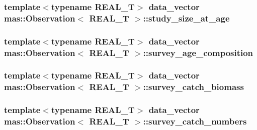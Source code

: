\subsubsection[{study\+\_\+size\+\_\+at\+\_\+age}]{\setlength{\rightskip}{0pt plus 5cm}template$<$typename R\+E\+A\+L\+\_\+\+T$>$ data\+\_\+vector {\bf mas\+::\+Observation}$<$ R\+E\+A\+L\+\_\+\+T $>$\+::study\+\_\+size\+\_\+at\+\_\+age}\label{classmas_1_1_observation_a10398b9be5c04879db2bec61fcdd2cee}
\hypertarget{classmas_1_1_observation_a03cceae9a50242b651530b0105ba5cc1}{}
\subsubsection[{survey\+\_\+age\+\_\+composition}]{\setlength{\rightskip}{0pt plus 5cm}template$<$typename R\+E\+A\+L\+\_\+\+T$>$ data\+\_\+vector {\bf mas\+::\+Observation}$<$ R\+E\+A\+L\+\_\+\+T $>$\+::survey\+\_\+age\+\_\+composition}\label{classmas_1_1_observation_a03cceae9a50242b651530b0105ba5cc1}
\hypertarget{classmas_1_1_observation_a4b522ae120f56ca4e0f059c5bd74feec}{}
\subsubsection[{survey\+\_\+catch\+\_\+biomass}]{\setlength{\rightskip}{0pt plus 5cm}template$<$typename R\+E\+A\+L\+\_\+\+T$>$ data\+\_\+vector {\bf mas\+::\+Observation}$<$ R\+E\+A\+L\+\_\+\+T $>$\+::survey\+\_\+catch\+\_\+biomass}\label{classmas_1_1_observation_a4b522ae120f56ca4e0f059c5bd74feec}
\hypertarget{classmas_1_1_observation_ab872d39efd69ea612fefb5b3eb22bd8a}{}
\subsubsection[{survey\+\_\+catch\+\_\+numbers}]{\setlength{\rightskip}{0pt plus 5cm}template$<$typename R\+E\+A\+L\+\_\+\+T$>$ data\+\_\+vector {\bf mas\+::\+Observation}$<$ R\+E\+A\+L\+\_\+\+T $>$\+::survey\+\_\+catch\+\_\+numbers}\label{classmas_1_1_observation_ab872d39efd69ea612fefb5b3eb22bd8a}
\hypertarget{classmas_1_1_observation_ad5abe789449f80832b9c22a6eac937bc}{}
